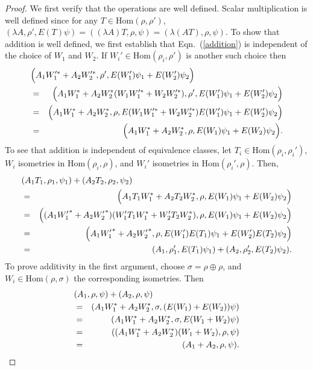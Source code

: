 \documentclass[12pt]{article}
\theoremstyle{definition}
\theoremstyle{definition}
\theoremstyle{remark}
\newcommand{\Hom}{\mathrm{Hom}}
\begin{document}
\begin{proof} We first verify that the operations are well defined.
  Scalar multiplication is well defined since for any $T\in \Hom (\rho
  ,\rho')$, $(\lambda A,\rho ',E(T)\psi )=((\lambda A)T,\rho ,\psi
  )=(\lambda (AT),\rho ,\psi )$.  To show that addition is well
  defined, we first establish that Eqn.\ (\ref{addition}) is
  independent of the choice of $W_1$ and $W_2$.  If $W_i'\in \Hom
  (\rho _i,\rho ')$ is another such choice then
  \begin{eqnarray*}
    \lefteqn{ \Bigl( A_1W_1'^*+A_2W_2'^*,\rho ',E(W_1')\psi _1+E(W_2')\psi _2 \Bigr) } \\
    &=& \Bigl( A_1W_1^*+A_2W_2^*(W_1W_1'^*+W_2W_2'^*),\rho ',E(W_1')\psi _1+E(W_2')\psi _2 \Bigr)  \\
    &=& \Bigl(A_1W_1^*+A_2W_2^*,\rho ,E(W_1W_1'^*+W_2W_2'^*)E(W_1')\psi _1+E(W_2')\psi _2 \Bigr) \\
    &=& \Bigl(A_1W_1^*+A_2W_2^*,\rho ,E(W_1)\psi _1+E(W_2)\psi _2 \Bigr) . \end{eqnarray*}  
  To see that addition is independent of equivalence classes, let $T_i\in \Hom (\rho
  _i,\rho _i')$, $W_i$ isometries in $\Hom (\rho _i,\rho )$, and $W_i'$ isometries in
  $\Hom (\rho _i',\rho )$.  Then, 
\begin{eqnarray*}
  \lefteqn{   (A_1T_1,\rho _1,\psi _1)+(A_2T_2,\rho _2,\psi _2) } \\
  &=& \Bigl( A_1T_1W_1^*+A_2T_2W_2^*,\rho ,E(W_1)\psi
  _1+E(W_2)\psi _2\Bigr) \\
  &=& \Bigl( (A_1{W'_1}^*+A_2{W'_2}^*)(W'_1T_1W_1^*+W'_2T_2W_2^*),\rho ,E(W_1)\psi _1+E(W_2)\psi _2\Bigr)
  \\
  &=& \Bigl( A_1{W'_1}^*+A_2{W'_2}^*,\rho ,E(W_1')E(T_1)\psi _1+E(W_2')E(T_2)\psi _2 \Bigr) \\
  &=& ( A_1,\rho _1', E(T_1)\psi _1)+(A_2,\rho _2',E(T_2)\psi _2 ) .\end{eqnarray*}
To prove additivity in the first argument, choose $\sigma =\rho \oplus \rho$, and
$W_i\in \Hom (\rho ,\sigma )$ the corresponding isometries.  Then  
\begin{eqnarray*}
  \lefteqn{ (A_1,\rho ,\psi )+(A_2,\rho ,\psi ) } \\
  & =& (A_1W_1^*+A_2W_2^*,\sigma ,(E(W_1)+E(W_2))\psi )  \\ 
  &=& (A_1W_1^*+A_2W_2^*,\sigma ,E(W_1+W_2)\psi ) \\
  &=& ((A_1W_1^*+A_2W_2^*)(W_1+W_2),\rho ,\psi ) \\
  &=& (A_1+A_2,\rho ,\psi ).\end{eqnarray*}  

\end{proof}
\end{document}
